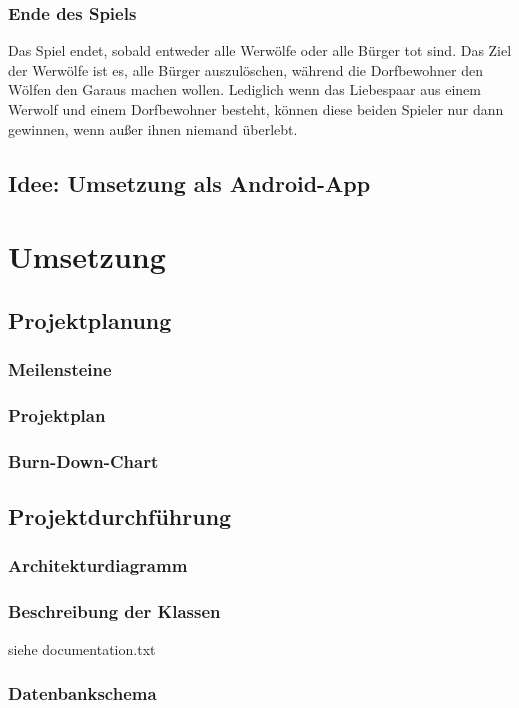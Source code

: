\documentclass[12pt]{article}
\begin{document}
\subsubsection{Ende des Spiels}
Das Spiel endet, sobald entweder alle Werwölfe oder alle Bürger tot sind.
Das Ziel der Werwölfe ist es, alle Bürger auszulöschen, während die Dorfbewohner den Wölfen den
Garaus machen wollen. Lediglich wenn das Liebespaar aus einem Werwolf und einem Dorfbewohner besteht,
können diese beiden Spieler nur dann gewinnen, wenn außer ihnen niemand überlebt.

\subsection{Idee: Umsetzung als Android-App}

\section{Umsetzung}

	\subsection{Projektplanung}
		\subsubsection{Meilensteine}
		\subsubsection{Projektplan}
		\subsubsection{Burn-Down-Chart}

	\subsection{Projektdurchführung}
		\subsubsection{Architekturdiagramm}
		\subsubsection{Beschreibung der Klassen}
		siehe documentation.txt
		
\subsubsection{Datenbankschema}
		
\end{document}
